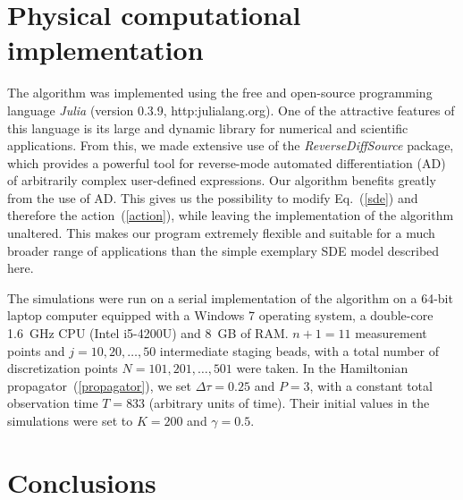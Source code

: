 \documentclass[11pt]{article}
\theoremstyle{definition}
\begin{document}
\section{Physical computational implementation}

The algorithm was implemented using the free and open-source programming language \emph{Julia} (version 0.3.9, http:\/\/julialang.org\/). One of the attractive features of this language is its large and dynamic library for numerical and scientific applications.
From this, we made extensive use of the \emph{ReverseDiffSource} package, which provides a powerful tool for reverse-mode automated differentiation (AD) of arbitrarily complex user-defined expressions. Our algorithm benefits greatly from the use of AD. This gives us the possibility to modify Eq.~(\ref{sde}) and therefore the action~(\ref{action}), while leaving the implementation of the algorithm unaltered. This makes our program extremely flexible and suitable for a much broader range of applications than the simple exemplary SDE model described here.
%

The simulations were run on a serial implementation of the algorithm on a 64-bit laptop computer equipped with a Windows 7 operating system, a double-core 1.6~GHz CPU (Intel i5-4200U) and 8~GB of RAM.  $n+1 = 11$ measurement points and $j = 10, 20,\dots, 50$ intermediate staging beads, with a total number of discretization points $N = 101, 201, \dots, 501$ were taken. In the Hamiltonian propagator~(\ref{propagator}), we set $\Delta\tau = 0.25$ and $P = 3$, with a constant total observation time $T = 833$ (arbitrary units of time).  Their initial values in the simulations were set to $K=200$ and $\gamma = 0.5$.
%



\section{Conclusions}
\end{document}
